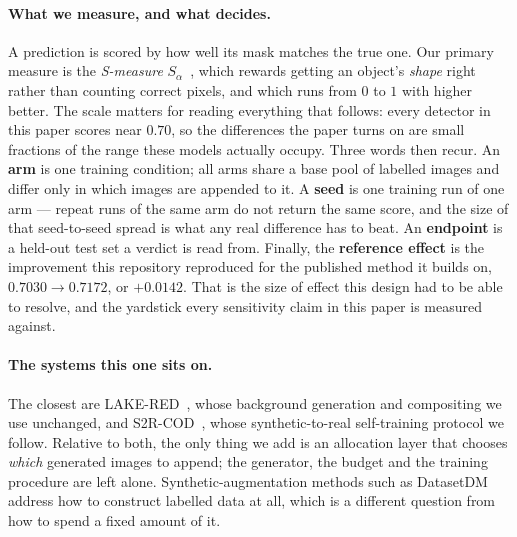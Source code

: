 \documentclass{article}
\begin{document}
\paragraph{What we measure, and what decides.} A prediction is scored by how well its mask matches
the true one. Our primary measure is the \emph{S-measure} $S_\alpha$~\citep{fan2017structure}, which
rewards getting an object's \emph{shape} right rather than counting correct pixels, and which runs
from $0$ to $1$ with higher better. The scale matters for reading everything that follows: every
detector in this paper scores near $0.70$, so the differences the paper turns on are small fractions
of the range these models actually occupy. Three words then recur. An \textbf{arm} is one training
condition; all arms share a base pool of labelled images and differ only in which images are
appended to it. A \textbf{seed} is one training run of one arm --- repeat runs of the same arm do
not return the same score, and the size of that seed-to-seed spread is what any real difference has
to beat. An \textbf{endpoint} is a held-out test set a verdict is read from. Finally, the
\textbf{reference effect} is the improvement this repository reproduced for the published method it
builds on, $0.7030 \rightarrow 0.7172$, or $+0.0142$. That is the size of effect this design had to
be able to resolve, and the yardstick every sensitivity claim in this paper is measured against.

\paragraph{The systems this one sits on.} The closest are
LAKE-RED~\citep{zhao2024lakered}, whose background generation and compositing we use unchanged, and
S2R-COD~\citep{luo2025s2rcod}, whose synthetic-to-real self-training protocol we follow. Relative to
both, the only thing we add is an allocation layer that chooses \emph{which} generated images to
append; the generator, the budget and the training procedure are left alone. Synthetic-augmentation
methods such as DatasetDM~\citep{wu2023datasetdm} address how to construct labelled data at all,
which is a different question from how to spend a fixed amount of it.
\end{document}
